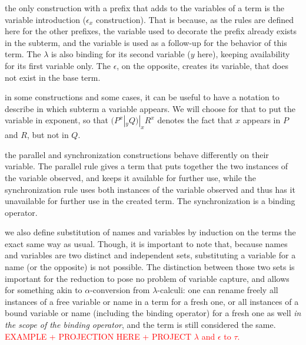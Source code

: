 \remark the only construction with a prefix that adds to the variables of a term is the variable introduction ($\epsilon_x$ construction). That is because, as the rules are defined here for the other prefixes, the variable used to decorate the prefix already exists in the subterm, and the variable is used as a follow-up for the behavior of this term. The $\lambda$ is also binding for its second variable ($y$ here), keeping availability for its first variable only. The $\epsilon$, on the opposite, creates its variable, that does not exist in the base term.

\remark in some constructions and some cases, it can be useful to have a notation to describe in which subterm a variable appears. We will choose for that to put the variable in exponent, so that $(P^x |_y Q) |_x R^x$ denotes the fact that $x$ appears in $P$ and $R$, but not in $Q$.

\remark the parallel and synchronization constructions behave differently on their variable. The parallel rule gives a term that puts together the two instances of the variable observed, and keeps it available for further use, while the synchronization rule uses both instances of the variable observed and thus has it unavailable for further use in the created term. The synchronization is a binding operator.

\remark we also define substitution of names and variables by induction on the terms the exact same way as usual. Though, it is important to note that, because names and variables are two distinct and independent sets, substituting a variable for a name (or the opposite) is not possible. The distinction between those two sets is important for the reduction to pose no problem of variable capture, and allows for something akin to $\alpha$-conversion from $\lambda$-calculi: one can rename freely all instances of a free variable or name in a term for a fresh one, or all instances of a bound variable or name (including the binding operator) for a fresh one as well \emph{in the scope of the binding operator}, and the term is still considered the same.\\

\textcolor{red}{EXAMPLE + PROJECTION HERE + PROJECT $\lambda$ and $\epsilon$ to $\tau$.}

